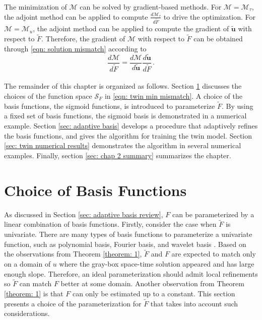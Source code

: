 The minimization of $\mathcal{M}$ can be solved by gradient-based methods.
For $\mathcal{M}=\mathcal{M}_{\tau}$, the adjoint method can be applied to compute 
$\frac{d\mathcal{M}_{\tau}}{d\tilde{F}}$ to drive the optimization.
For $\mathcal{M} = \mathcal{M}_u$, the adjoint method can be 
applied to compute the gradient of $\tilde{\boldsymbol{u}}$ with respect
to $\tilde{F}$. Therefore, the gradient of $\mathcal{M}$ with respect to $\tilde{F}$ can be 
obtained through 
\eqref{eqn: solution mismatch} according to
\begin{equation}
    \frac{d\mathcal{M}}{d\tilde{F}} = \frac{d\mathcal{M}}{d\tilde{\boldsymbol{u}}} \frac{d\tilde{\boldsymbol{u}}}{d\tilde{F}}\,.
    \label{eqn: estimated gradient temp}
\end{equation}\\


The remainder of this chapter is organized as follows.
Section \ref{sec: flux param} discusses the choices of the function space $\mathcal{S}_F$
in \eqref{eqn: twin min mismatch}.
A choice of the basis functions, the sigmoid functions, 
is introduced to parameterize $\tilde{F}$. By using a fixed set of basis functions, the sigmoid basis
is demonstrated in a numerical example.
Section \ref{sec: adaptive basis} develops a procedure that adaptively refines the
basis functions,
and gives the algorithm for training the twin model. 
Section \ref{sec: twin numerical results} demonstrates the algorithm in several numerical examples.
Finally, section \ref{sec: chap 2 summary} summarizes the chapter.\\


\section{Choice of Basis Functions}
\label{sec: flux param}
As discussed in Section \ref{sec: adaptive basis review}, 
$F$ can be parameterized by a linear combination of basis functions.
Firstly, consider the case when $\tilde{F}$ is univariate. 
There are many types of basis
functions to parameterize a univariate function, such as polynomial basis, Fourier basis, and
wavelet basis \cite{wavelet mallat}. 
Based on the observations from Theorem \ref{theorem: 1}, $\tilde{F}$ and $F$
are expected to match only on a domain of $u$ 
where the gray-box space-time solution appeared and has large enough slope.
Therefore, an ideal parameterization should 
admit local refinements so $\tilde{F}$ can match $F$ better at some domain.
Another observation from Theorem \ref{theorem: 1} is that $F$ can only be estimated up to 
a constant.
This section presents a choice of the parameterization for $\tilde{F}$ that takes into account
such considerations.\\

